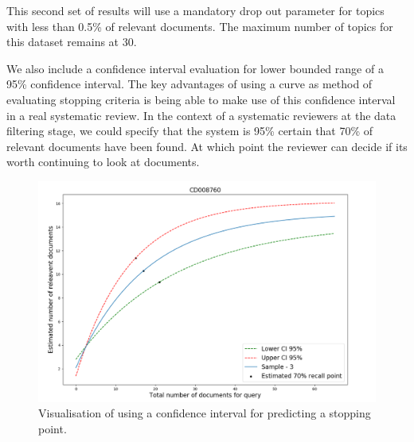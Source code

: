 This second set of results will use a mandatory drop out parameter for topics with less than 0.5\% of relevant documents.  The maximum number of topics for this dataset remains at 30.

We also include a confidence interval evaluation for lower bounded range of a 95\% confidence interval. The key advantages of using a curve as  method of evaluating stopping criteria is being able to make use of this confidence interval in a real systematic review. In the context of a systematic reviewers at the data filtering stage, we could specify that the system is 95\% certain that 70\% of relevant documents have been found. At which point the reviewer can decide if its worth continuing to look at documents.

\begin{figure}[H]
\center
\includegraphics[width=12cm]{figures/cf_example.png}
\caption{Visualisation of using a confidence interval for predicting a stopping point.}
\end{figure}




